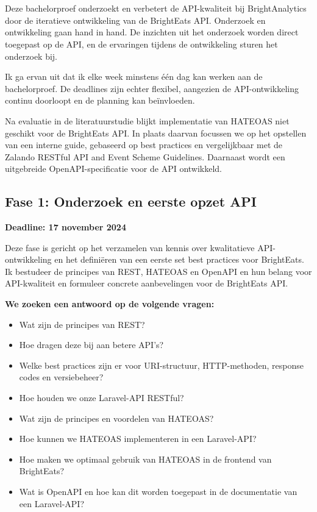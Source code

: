 
\chapter{}%
\label{ch:methodologie}

Deze bachelorproef onderzoekt en verbetert de API-kwaliteit bij BrightAnalytics door de iteratieve ontwikkeling van de BrightEats API. Onderzoek en ontwikkeling gaan hand in hand. De inzichten uit het onderzoek worden direct toegepast op de API, en de ervaringen tijdens de ontwikkeling sturen het onderzoek bij.

Ik ga ervan uit dat ik elke week minstens \'e\'en dag kan werken aan de bachelorproef. De deadlines zijn echter flexibel, aangezien de API-ontwikkeling continu doorloopt en de planning kan be\"invloeden.

Na evaluatie in de literatuurstudie blijkt implementatie van HATEOAS niet geschikt voor de BrightEats API. In plaats daarvan focussen we op het opstellen van een interne guide, gebaseerd op best practices en vergelijkbaar met de Zalando RESTful API and Event Scheme Guidelines. Daarnaast wordt een uitgebreide OpenAPI-specificatie voor de API ontwikkeld.

\section{Fase 1: Onderzoek en eerste opzet API}

\textbf{Deadline: 17 november 2024}

Deze fase is gericht op het verzamelen van kennis over kwalitatieve API-ontwikkeling en het defini\"eren van een eerste set best practices voor BrightEats. Ik bestudeer de principes van REST, HATEOAS en OpenAPI en hun belang voor API-kwaliteit en formuleer concrete aanbevelingen voor de BrightEats API.

\bigskip

\textbf{We zoeken een antwoord op de volgende vragen:}
\begin{itemize}
  \item Wat zijn de principes van REST?
  \item Hoe dragen deze bij aan betere API's?
  \item Welke best practices zijn er voor URI-structuur, HTTP-methoden, response codes en versiebeheer?
  \item Hoe houden we onze Laravel-API RESTful?
  \item Wat zijn de principes en voordelen van HATEOAS?
  \item Hoe kunnen we HATEOAS implementeren in een Laravel-API?
  \item Hoe maken we optimaal gebruik van HATEOAS in de frontend van BrightEats?
  \item Wat is OpenAPI en hoe kan dit worden toegepast in de documentatie van een Laravel-API?
\end{itemize}

